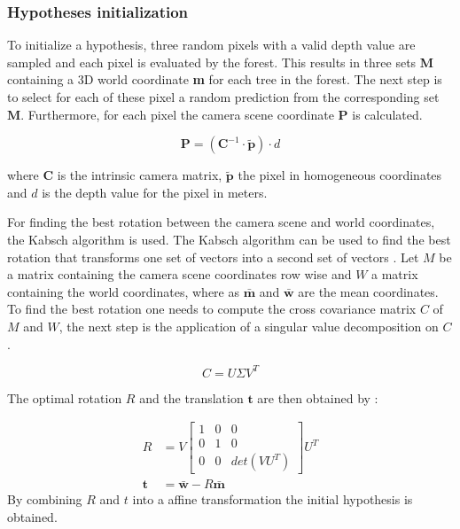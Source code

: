 \documentclass[final]{cvpr}
\begin{document}
\subsubsection{Hypotheses initialization}
To initialize a hypothesis, three random pixels with a valid depth value are sampled and each pixel is evaluated by the forest. This results in three sets 
\textbf{M} containing a 3D world coordinate \textbf{m} for each tree in the forest. The next step is to select for each of these 
pixel a random prediction from the corresponding set $\boldsymbol{M}$. 
Furthermore, for each pixel the camera scene coordinate $\boldsymbol{P}$ is calculated.

\begin{equation}
	\boldsymbol{P} = (\boldsymbol{C}^{-1} \cdot \boldsymbol{\tilde{p}} ) \cdot d
\end{equation}

where $\boldsymbol{C}$ is the intrinsic camera matrix, $\boldsymbol{\tilde{p}}$ the pixel in
homogeneous coordinates and $d$ is the depth value for the pixel in meters. 

For finding the best
rotation between the camera scene and world coordinates, the Kabsch algorithm is used. The Kabsch algorithm can be used to find the best rotation that transforms one set of vectors into a second set of vectors \cite{Kabsch1976}.
Let $M$ be a matrix containing the camera scene coordinates row wise and $W$ a matrix containing
the world coordinates, where as $\boldsymbol{\bar{m}}$ and $\boldsymbol{\bar{w}}$ are the mean coordinates.
To find the best rotation one needs to compute the cross covariance matrix $C$ of $M$ and $W$, the 
next step is the application of a singular value decomposition on $C$ \cite{Brachmann2020}.

\begin{equation}
	C = U \Sigma V^T
\end{equation}

The optimal rotation $R$ and the translation $\boldsymbol{t}$ are then obtained by \cite{Brachmann2020}:

\begin{equation}
	\begin{split}
		R &= V 
		\begin{bmatrix}
			1 & 0 & 0\\
			0 & 1 & 0\\
			0 & 0 & det(VU^T)
		\end{bmatrix}
		U^T \\
		\boldsymbol{t} &= \boldsymbol{\bar{w}} - R \boldsymbol{\bar{m}}
	\end{split}
\end{equation}
 By combining $R$ and $t$ into a affine transformation the initial hypothesis is obtained.
 
\end{document}

